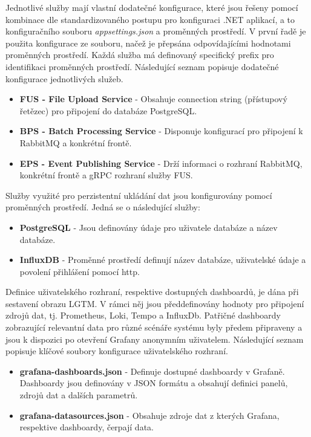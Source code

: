 Jednotlivé služby mají vlastní dodatečné konfigurace, které jsou řešeny pomocí kombinace dle standardizovaného postupu pro konfiguraci .NET aplikací, a to konfiguračního souboru \emph{appsettings.json} a proměnných prostředí. V první řadě je použita konfigurace ze souboru, načež je přepsána odpovídajícími hodnotami proměnných prostředí. Každá služba má definovaný specifický prefix pro identifikaci proměnných prostředí. Následující seznam popisuje dodatečné konfigurace jednotlivých služeb.

\begin{itemize}
  \item \textbf{FUS - File Upload Service} - Obsahuje connection string (přístupový řetězec) pro připojení do databáze PostgreSQL.
  \item \textbf{BPS - Batch Processing Service} - Disponuje konfigurací pro připojení k RabbitMQ a konkrétní frontě.
  \item \textbf{EPS - Event Publishing Service} - Drží informaci o rozhraní RabbitMQ, konkrétní frontě a gRPC rozhraní služby FUS.
\end{itemize}

Služby využité pro perzistentní ukládání dat jsou konfigurovány pomocí proměnných prostředí. Jedná se o následující služby:

\begin{itemize}
  \item \textbf{PostgreSQL} - Jsou definovány údaje pro uživatele databáze a název databáze.
  \item \textbf{InfluxDB} - Proměnné prostředí definují název databáze, uživatelské údaje a povolení přihlášení pomocí http.
\end{itemize}

Definice uživatelského rozhraní, respektive dostupných dashboardů, je dána při sestavení obrazu LGTM. V rámci něj jsou předdefinovány hodnoty pro připojení zdrojů dat, tj. Prometheus, Loki, Tempo a InfluxDb. Patřičné dashboardy zobrazující relevantní data pro různé scénáře systému byly předem připraveny a jsou k dispozici po otevření Grafany anonymním uživatelem. Následující seznam popisuje klíčové soubory konfigurace uživatelského rozhraní.

\begin{itemize}
  \item \textbf{grafana-dashboards.json} - Definuje dostupné dashboardy v Grafaně. Dashboardy jsou definovány v JSON formátu a obsahují definici panelů, zdrojů dat a dalších parametrů.
  \item \textbf{grafana-datasources.json} - Obsahuje  zdroje dat z kterých Grafana, respektive dashboardy, čerpají data.
\end{itemize}